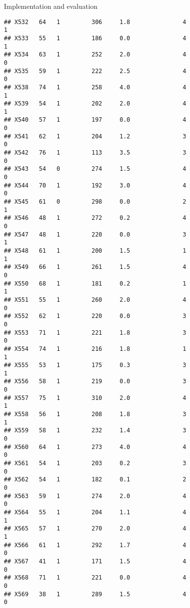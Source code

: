 \documentclass[
  ignorenonframetext,
]{beamer}
\begin{document}
\begin{frame}[fragile]{Implementation and evaluation}
\begin{verbatim}
## X532   64   1         306     1.8               4                   1
## X533   55   1         186     0.0               4                   1
## X534   63   1         252     2.0               4                   0
## X535   59   1         222     2.5               4                   0
## X538   74   1         258     4.0               4                   1
## X539   54   1         202     2.0               4                   1
## X540   57   1         197     0.0               4                   0
## X541   62   1         204     1.2               3                   0
## X542   76   1         113     3.5               3                   0
## X543   54   0         274     1.5               4                   0
## X544   70   1         192     3.0               4                   0
## X545   61   0         298     0.0               2                   1
## X546   48   1         272     0.2               4                   0
## X547   48   1         220     0.0               3                   1
## X548   61   1         200     1.5               1                   1
## X549   66   1         261     1.5               4                   0
## X550   68   1         181     0.2               1                   1
## X551   55   1         260     2.0               4                   0
## X552   62   1         220     0.0               3                   0
## X553   71   1         221     1.8               3                   0
## X554   74   1         216     1.8               1                   1
## X555   53   1         175     0.3               3                   1
## X556   58   1         219     0.0               3                   0
## X557   75   1         310     2.0               4                   1
## X558   56   1         208     1.8               3                   1
## X559   58   1         232     1.4               3                   0
## X560   64   1         273     4.0               4                   0
## X561   54   1         203     0.2               3                   0
## X562   54   1         182     0.1               2                   0
## X563   59   1         274     2.0               4                   0
## X564   55   1         204     1.1               4                   1
## X565   57   1         270     2.0               4                   1
## X566   61   1         292     1.7               4                   0
## X567   41   1         171     1.5               4                   0
## X568   71   1         221     0.0               4                   0
## X569   38   1         289     1.5               4                   0

\end{verbatim}
\end{frame}
\end{document}
